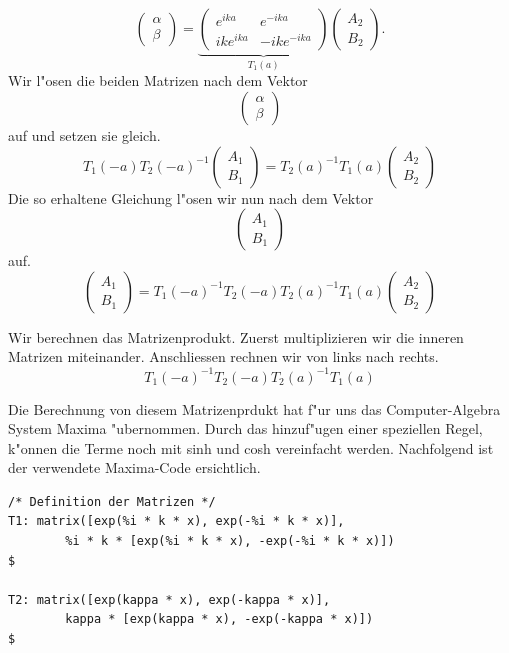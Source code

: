 \begin{refsection}
\[\begin{pmatrix}
\alpha
\\
\beta
\end{pmatrix}
 = 
\underbrace{
\begin{pmatrix}
e^{ika}
&
e^{-ika}
\\
ike^{ika}
&
-ike^{-ika}
\end{pmatrix}
}_{T_1(a)}
\begin{pmatrix}
A_2
\\
B_2
\end{pmatrix}.
\]
Wir l"osen die beiden Matrizen nach dem Vektor
\[
\begin{pmatrix}
\alpha
\\
\beta
\end{pmatrix}
\]
auf und setzen sie gleich.
\[
T_1(-a)T_2(-a)^{-1}
\begin{pmatrix}
A_1
\\
B_1
\end{pmatrix}
=
T_2(a)^{-1}T_1(a)
\begin{pmatrix}
A_2
\\
B_2
\end{pmatrix}
\]
Die so erhaltene Gleichung l"osen wir nun nach dem Vektor
\[
\begin{pmatrix}
A_1
\\
B_1
\end{pmatrix}
\]
auf.
\[
\begin{pmatrix}
A_1
\\
B_1
\end{pmatrix}
=
T_1(-a)^{-1}T_2(-a)T_2(a)^{-1}T_1(a)
\begin{pmatrix}
A_2
\\
B_2
\end{pmatrix}
\]

Wir berechnen das Matrizenprodukt. 
Zuerst multiplizieren wir die inneren Matrizen miteinander. 
Anschliessen rechnen wir von links nach rechts. 
\[
T_1(-a)^{-1}T_2(-a)T_2(a)^{-1}T_1(a)
\]

Die Berechnung von diesem Matrizenprdukt hat f"ur uns das Computer-Algebra System Maxima "ubernommen. 
Durch das hinzuf"ugen einer speziellen Regel, k"onnen die Terme noch mit sinh und cosh vereinfacht werden.
Nachfolgend ist der verwendete Maxima-Code ersichtlich.

\begin{lstlisting}[style=Maxima]
/* Definition der Matrizen */
T1: matrix([exp(%i * k * x), exp(-%i * k * x)],
        %i * k * [exp(%i * k * x), -exp(-%i * k * x)])                      $

T2: matrix([exp(kappa * x), exp(-kappa * x)],
        kappa * [exp(kappa * x), -exp(-kappa * x)])                         $


\end{lstlisting}
\end{refsection}
